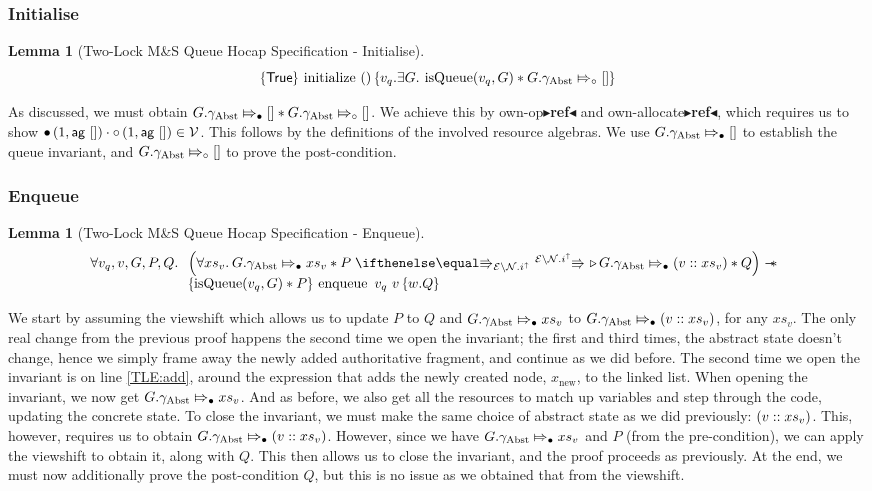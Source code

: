 \documentclass[a4paper, 10pt]{report}
\theoremstyle{definition}
\newtheorem{lemma}[theorem]{Lemma}
\newcommand{\initialise}{\operatorname{initialize}}
\newcommand{\enqueue}{\operatorname{enqueue}}
\newcommand{\msq}{M\&S Queue}
\newcommand{\tlmsq}{Two-Lock \msq{}}
\newcommand{\isqueue}{\operatorname{isQueue}}
\newcommand{\vq}{v_q}
\newcommand{\node}{x}
\newcommand{\nodeN}[1]{\node_{\mathrm{#1}}}
\newcommand{\nodenew}{\nodeN{new}}
\newcommand{\absvalue}{\val}
\newcommand{\absvalueList}{xs_v}
\newcommand{\Qg}{G}
\newcommand{\gabst}{\gname_{\mathrm{Abst}}}
\newcommand{\Vl}{\ensuremath{\mathcal{V}}}
\newcommand{\Nl}{\ensuremath{\mathcal{N}}}
\newcommand{\abstractstatefullfrag}[2]{#1 \Mapsto_{\circ} #2}
\newcommand{\abstractstateauth}[2]{#1 \Mapsto_{\bullet} #2}
\newcommand{\tlhocapspecinitHTGen}[2]{\hoare{\TRUE}{\initialise \ \TT}{#1 . \Exists #2 . \isqueue(#1, #2) \star{} \abstractstatefullfrag{#2.\gabst}{[]}}}
\newcommand{\tlhocapspecinitGen}[2]{\tlhocapspecinitHTGen{#1}{#2}}
\newcommand{\tlhocapspecinit}{\tlhocapspecinitGen{\vq}{\Qg}}
\newcommand{\tlhocapspecenqVS}[5]{\abstractstateauth{#2.\gabst}{#5} \star{} #3 \vs[\mask\setminus\Nl.i^\uparrow] \later \abstractstateauth{#2.\gabst}{(#1 :: #5)} \star{} #4}
\newcommand{\tlhocapspecenqHT}[5]{\hoare{\isqueue(#1, #3) \star{} #4}{\enqueue \ #1 \ #2}{\valB . #5}}
\newcommand{\tlhocapspecenqGen}[6]{\All #1, #2, #3, #4, #5.
\begin{array}[t]{l}
\left(\All #6 . \tlhocapspecenqVS{#2}{#3}{#4}{#5}{#6} \right)
\wand\\
\tlhocapspecenqHT{#1}{#2}{#3}{#4}{#5}
\end{array}}
\newcommand{\tlhocapspecenq}{\tlhocapspecenqGen{\vq}{\absvalue}{\Qg}{P}{Q}{\absvalueList}}
\newcommand{\todo}[1]{{\color[rgb]{.5,0,0}\textbf{$\blacktriangleright$#1$\blacktriangleleft$}}}
\begin{document}
\subsubsection{Initialise}
\begin{lemma}[\tlmsq{} Hocap Specification - Initialise]\label{TLMSQ:spec:hocap:initialise}
  \begin{equation*}
    \tlhocapspecinit
  \end{equation*}
\end{lemma}
As discussed, we must obtain $\abstractstateauth{\Qg.\gabst}{[]} \star{} \abstractstatefullfrag{\Qg.\gabst}{[]}$. We achieve this by own-op\todo{ref} and own-allocate\todo{ref}, which requires us to show $\authfull (1, \aginj ~ []) \mtimes \authfrag (1, \aginj ~ []) \in \Vl$. This follows by the definitions of the involved resource algebras. We use $\abstractstateauth{\Qg.\gabst}{[]}$ to establish the queue invariant, and $\abstractstatefullfrag{\Qg.\gabst}{[]}$ to prove the post-condition.


\subsubsection{Enqueue}
\begin{lemma}[\tlmsq{} Hocap Specification - Enqueue]\label{TLMSQ:spec:hocap:enqueue}
  \begin{equation*}
    \tlhocapspecenq
  \end{equation*}
\end{lemma}
We start by assuming the viewshift which allows us to update $P$ to $Q$ and $\abstractstateauth{\Qg.\gabst}{\absvalueList}$ to $\abstractstateauth{\Qg.\gabst}{(\absvalue :: \absvalueList)}$, for any $\absvalueList$. The only real change from the previous proof happens the second time we open the invariant; the first and third times, the abstract state doesn't change, hence we simply frame away the newly added authoritative fragment, and continue as we did before. The second time we open the invariant is on line \ref{TLE:add}, around the expression that adds the newly created node, $\nodenew$, to the linked list. When opening the invariant, we now get $\abstractstateauth{\Qg.\gabst}{\absvalueList}$. And as before, we also get all the resources to match up variables and step through the code, updating the concrete state. To close the invariant, we must make the same choice of abstract state as we did previously: $(\absvalue :: \absvalueList)$. This, however, requires us to obtain $\abstractstateauth{\Qg.\gabst}{(\absvalue :: \absvalueList)}$. However, since we have $\abstractstateauth{\Qg.\gabst}{\absvalueList}$ and $P$ (from the pre-condition), we can apply the viewshift to obtain it, along with $Q$. This then allows us to close the invariant, and the proof proceeds as previously. At the end, we must now additionally prove the post-condition $Q$, but this is no issue as we obtained that from the viewshift.
\end{document}
